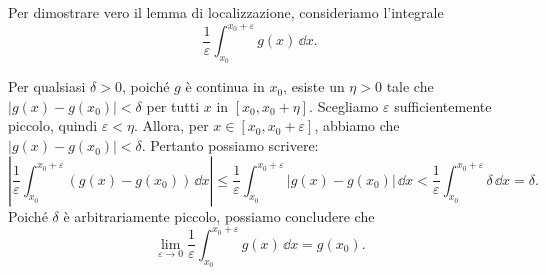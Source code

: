 \begin{remark}

	Per dimostrare vero il lemma di localizzazione, consideriamo l'integrale
	\[
	\frac{1}{\varepsilon} \int_{x_0}^{x_0 + \varepsilon} g(x) \, \dd x.
	\]
	
	Per qualsiasi \(\delta > 0\), poiché \(g\) è continua in \(x_0\), esiste un \(\eta > 0\) tale che \( |g(x) - g(x_0)| < \delta \) per tutti \(x\) in \([x_0, x_0 + \eta]\).
	Scegliamo \(\varepsilon\) sufficientemente piccolo, quindi \(\varepsilon < \eta\). Allora, per \(x \in [x_0, x_0 + \varepsilon]\), abbiamo che \( |g(x) - g(x_0)| < \delta \).
	Pertanto possiamo scrivere:
	\[
	\left| \frac{1}{\varepsilon} \int_{x_0}^{x_0 + \varepsilon} (g(x) - g(x_0)) \, \dd x \right| \leq \frac{1}{\varepsilon} \int_{x_0}^{x_0 + \varepsilon} |g(x) - g(x_0)| \, \dd x < \frac{1}{\varepsilon} \int_{x_0}^{x_0 + \varepsilon} \delta \, \dd x=\delta.
	\]
%
Poiché \(\delta\) è arbitrariamente piccolo, possiamo concludere che
		\[
	\lim_{\varepsilon \to 0} \frac{1}{\varepsilon} \int_{x_0}^{x_0 + \varepsilon} g(x) \, \dd x = g(x_0).
	\]
\end{remark}

